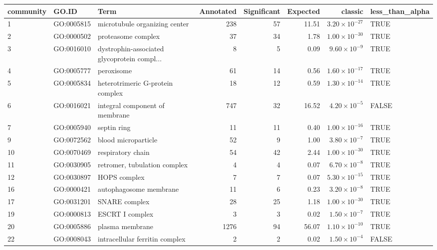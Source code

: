 \begin{table}[ht]
\centering
\begin{adjustbox}{max width=\textwidth}
\begin{tabular}{lllrrrrl}
  \hline
community & GO.ID & Term & Annotated & Significant & Expected & classic & less\_than\_alpha \\ 
  \hline
1 & GO:0005815 & microtubule organizing center & 238 & 57 & 11.51 & $3.20 \times 10^{-27}$ & TRUE \\ 
  2 & GO:0000502 & proteasome complex & 37 & 34 & 1.78 & $1.00 \times 10^{-30}$ & TRUE \\ 
  3 & GO:0016010 & dystrophin-associated glycoprotein compl... & 8 & 5 & 0.09 & $9.60 \times 10^{-9}$ & TRUE \\ 
  4 & GO:0005777 & peroxisome & 61 & 14 & 0.56 & $1.60 \times 10^{-17}$ & TRUE \\ 
  5 & GO:0005834 & heterotrimeric G-protein complex & 18 & 12 & 0.59 & $1.30 \times 10^{-14}$ & TRUE \\ 
  6 & GO:0016021 & integral component of membrane & 747 & 32 & 16.52 & $4.20 \times 10^{-5}$ & FALSE \\ 
   7 & GO:0005940 & septin ring & 11 & 11 & 0.40 & $1.00 \times 10^{-16}$ & TRUE \\ 
  9 & GO:0072562 & blood microparticle & 52 & 9 & 1.00 & $3.80 \times 10^{-7}$ & TRUE \\ 
  10 & GO:0070469 & respiratory chain & 54 & 42 & 2.44 & $1.00 \times 10^{-30}$ & TRUE \\ 
  11 & GO:0030905 & retromer, tubulation complex & 4 & 4 & 0.07 & $6.70 \times 10^{-8}$ & TRUE \\ 
  12 & GO:0030897 & HOPS complex & 7 & 7 & 0.07 & $5.30 \times 10^{-15}$ & TRUE \\ 
  16 & GO:0000421 & autophagosome membrane & 11 & 6 & 0.23 & $3.20 \times 10^{-8}$ & TRUE \\ 
  17 & GO:0031201 & SNARE complex & 28 & 25 & 1.18 & $1.00 \times 10^{-30}$ & TRUE \\ 
  19 & GO:0000813 & ESCRT I complex & 3 & 3 & 0.02 & $1.50 \times 10^{-7}$ & TRUE \\ 
  20 & GO:0005886 & plasma membrane & 1276 & 94 & 56.07 & $1.10 \times 10^{-10}$ & TRUE \\ 
  22 & GO:0008043 & intracellular ferritin complex & 2 & 2 & 0.02 & $1.50 \times 10^{-4}$ & FALSE \\ 

\end{tabular}
\end{adjustbox}
\end{table}
